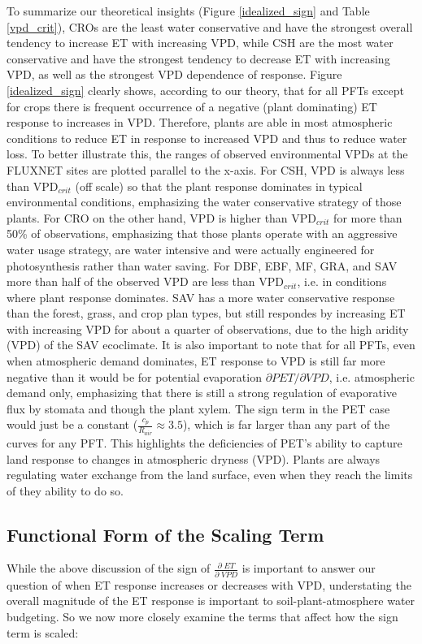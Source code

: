 \documentclass[draft,linenumbers]{agujournal}
\begin{document}
To summarize our theoretical insights (Figure \ref{idealized_sign} and Table \ref{vpd_crit}), CROs are the least water conservative and have the strongest overall tendency to increase ET with increasing VPD, while CSH are the most water conservative and have the strongest tendency to decrease ET with increasing VPD, as well as the strongest VPD dependence of response. Figure \ref{idealized_sign} clearly shows, according to our theory, that for all PFTs except for crops there is frequent occurrence of a negative (plant dominating) ET response to increases in VPD. Therefore, plants are able in most atmospheric conditions to reduce ET in response to increased VPD and thus to reduce water loss. To better illustrate this, the ranges of observed environmental VPDs at the FLUXNET sites are plotted parallel to the x-axis. For CSH, VPD is always less than VPD$_{crit}$ (off scale) so that the plant response dominates in typical environmental conditions, emphasizing the water conservative strategy of those plants. For CRO on the other hand, VPD is higher than VPD$_{crit}$ for more than 50\% of observations, emphasizing that those plants operate with an aggressive water usage strategy, are water intensive and were actually engineered for photosynthesis rather than water saving. For DBF, EBF, MF, GRA, and SAV  more than half of the observed VPD are less than VPD$_{crit}$, i.e. in conditions where plant response dominates. SAV has a more water conservative response than the forest, grass, and crop plan types, but still respondes by increasing ET with increasing VPD for about a quarter of observations, due to the high aridity (VPD) of the SAV ecoclimate. It is also important to note that for all PFTs, even when atmospheric demand dominates, ET response to VPD is still far more negative than it would be for potential evaporation $\partial PET/\partial VPD$, i.e. atmospheric demand only, emphasizing that there is still a strong regulation of evaporative flux by stomata and though the plant xylem. The sign term in the PET case would just be a constant ($\frac{c_p}{R_{air}} \approx 3.5$), which is far larger than any part of the curves for any PFT. This highlights the deficiencies of PET's ability to capture land response to changes in atmospheric dryness (VPD). Plants are always regulating water exchange from the land surface, even when they reach the limits of they ability to do so. 

\subsection{Functional Form of the Scaling Term}
\label{scale_term}
While the above discussion of the sign of $\frac{\partial \; ET}{\partial \; VPD}$ is important to answer our question of when ET response increases or decreases with VPD, understating the overall magnitude of the ET response is important to soil-plant-atmosphere water budgeting. So we now more closely examine the terms that affect how the sign term is scaled:
\end{document}
